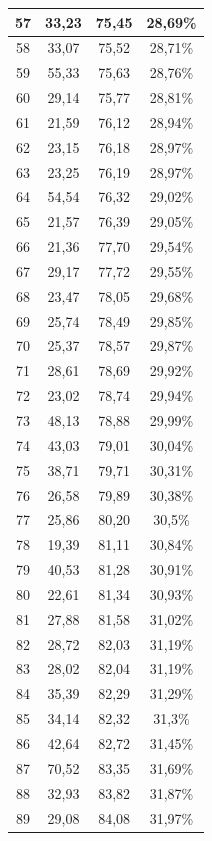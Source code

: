 \begin{longtable}{|c|c|c|c|}
	57 & 33,23 & 75,45 & 28,69\% \\ \hline
	58 & 33,07 & 75,52 & 28,71\% \\ \hline
	59 & 55,33 & 75,63 & 28,76\% \\ \hline
	60 & 29,14 & 75,77 & 28,81\% \\ \hline
	61 & 21,59 & 76,12 & 28,94\% \\ \hline
	62 & 23,15 & 76,18 & 28,97\% \\ \hline
	63 & 23,25 & 76,19 & 28,97\% \\ \hline
	64 & 54,54 & 76,32 & 29,02\% \\ \hline
	65 & 21,57 & 76,39 & 29,05\% \\ \hline
	66 & 21,36 & 77,70 & 29,54\% \\ \hline
	67 & 29,17 & 77,72 & 29,55\% \\ \hline
	68 & 23,47 & 78,05 & 29,68\% \\ \hline
	69 & 25,74 & 78,49 & 29,85\% \\ \hline
	70 & 25,37 & 78,57 & 29,87\% \\ \hline
	71 & 28,61 & 78,69 & 29,92\% \\ \hline
	72 & 23,02 & 78,74 & 29,94\% \\ \hline
	73 & 48,13 & 78,88 & 29,99\% \\ \hline
	74 & 43,03 & 79,01 & 30,04\% \\ \hline
	75 & 38,71 & 79,71 & 30,31\% \\ \hline
	76 & 26,58 & 79,89 & 30,38\% \\ \hline
	77 & 25,86 & 80,20 & 30,5\% \\ \hline
	78 & 19,39 & 81,11 & 30,84\% \\ \hline
	79 & 40,53 & 81,28 & 30,91\% \\ \hline
	80 & 22,61 & 81,34 & 30,93\% \\ \hline
	81 & 27,88 & 81,58 & 31,02\% \\ \hline
	82 & 28,72 & 82,03 & 31,19\% \\ \hline
	83 & 28,02 & 82,04 & 31,19\% \\ \hline
	84 & 35,39 & 82,29 & 31,29\% \\ \hline
	85 & 34,14 & 82,32 & 31,3\% \\ \hline
	86 & 42,64 & 82,72 & 31,45\% \\ \hline
	87 & 70,52 & 83,35 & 31,69\% \\ \hline
	88 & 32,93 & 83,82 & 31,87\% \\ \hline
	89 & 29,08 & 84,08 & 31,97\% \\ \hline

\end{longtable}

